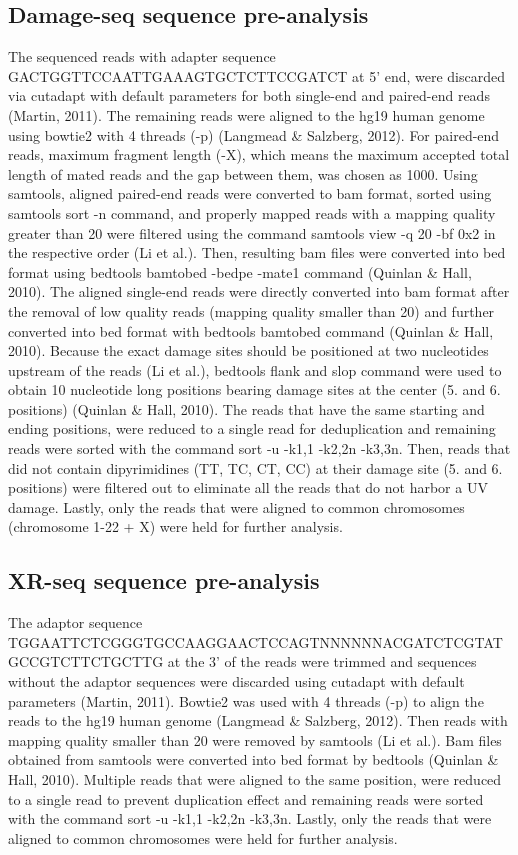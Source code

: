 \subsection{Damage-seq sequence pre-analysis}
The sequenced reads with adapter sequence GACTGGTTCCAATTGAAAGTGCTCTTCCGATCT at 5' end, were discarded via cutadapt with default parameters for both single-end and paired-end reads (Martin, 2011). The remaining reads were aligned to the hg19 human genome using bowtie2 with 4 threads (-p) (Langmead \& Salzberg, 2012). For paired-end reads, maximum fragment length (-X), which means the maximum accepted total length of mated reads and the gap between them, was chosen as 1000. Using samtools, aligned paired-end reads were converted to bam format, sorted using samtools sort -n command, and properly mapped reads with a mapping quality greater than 20 were filtered using the command samtools view -q 20 -bf 0x2 in the respective order (Li et al.). Then, resulting bam files were converted into bed format using bedtools bamtobed -bedpe -mate1 command (Quinlan \& Hall, 2010). The aligned single-end reads were directly converted into bam format after the removal of low quality reads (mapping quality smaller than 20) and further converted into bed format with bedtools bamtobed command (Quinlan \& Hall, 2010). Because the exact damage sites should be positioned at two nucleotides upstream of the reads (Li et al.), bedtools flank and slop command were used to obtain 10 nucleotide long positions bearing damage sites at the center (5. and 6. positions) (Quinlan \& Hall, 2010). The reads that have the same starting and ending positions, were reduced to a single read for deduplication and remaining reads were sorted with the command sort -u -k1,1 -k2,2n -k3,3n. Then, reads that did not contain dipyrimidines (TT, TC, CT, CC) at their damage site (5. and 6. positions) were filtered out to eliminate all the reads that do not harbor a UV damage. Lastly, only the reads that were aligned to common chromosomes (chromosome 1-22 + X) were held for further analysis.

\subsection{XR-seq sequence pre-analysis}
The adaptor sequence TGGAATTCTCGGGTGCCAAGGAACTCCAGTNNNNNNACGATCTCGTATGCCGTCTTCTGCTTG at the 3' of the reads were trimmed and sequences without the adaptor sequences were discarded using cutadapt with default parameters (Martin, 2011). Bowtie2 was used with 4 threads (-p) to align the reads to the hg19 human genome (Langmead \& Salzberg, 2012). Then reads with mapping quality smaller than 20 were removed by samtools (Li et al.). Bam files obtained from samtools were converted into bed format by bedtools (Quinlan \& Hall, 2010). Multiple reads that were aligned to the same position, were reduced to a single read to prevent duplication effect and remaining reads were sorted with the command sort -u -k1,1 -k2,2n -k3,3n. Lastly, only the reads that were aligned to common chromosomes were held for further analysis.


